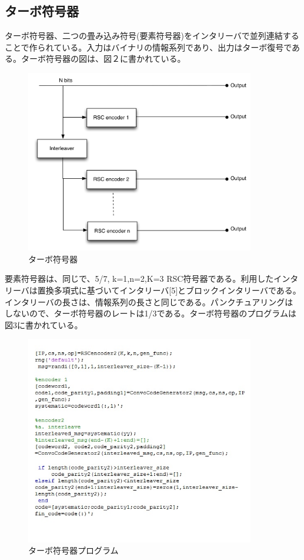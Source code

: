 \documentclass[20 pts]{article}
\begin{document}
\subsection{ターボ符号器}
ターボ符号器、二つの畳み込み符号(要素符号器)をインタリーバで並列連結することで作られている。入力はバイナリの情報系列であり、出力はターボ復号である。ターボ符号器の図は、図２に書かれている。
\begin{figure}[h!]
\includegraphics[width=10cm]{turboencoder.jpg}
\caption{ターボ符号器}
\label{}
\end{figure}
要素符号器は、同じで、5/7, k=1,n=2,K=3 RSC符号器である。利用したインタリーバは置換多項式に基づいてインタリーバ[5]とブロックインタリーバである。インタリーバの長さは、情報系列の長さと同じである。パンクチュアリングはしないので、ターボ符号器のレートは1/3である。ターボ符号器のプログラムは図3に書かれている。
\begin{figure}[h!]
\includegraphics[width=10cm]{zu3.jpg}
\caption{ターボ符号器プログラム}
\label{}
\end{figure}
\end{document}
